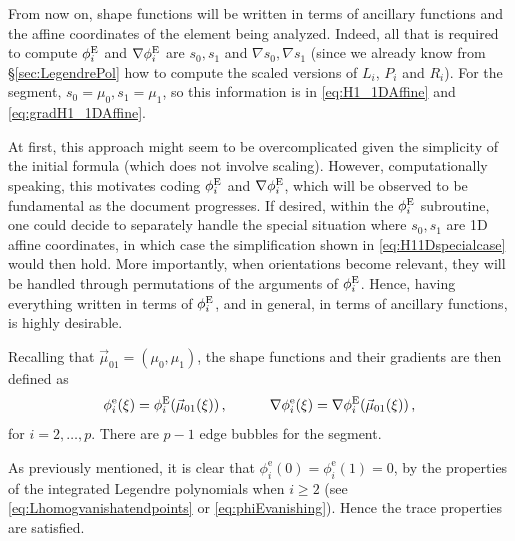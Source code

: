 From now on, shape functions will be written in terms of ancillary functions and the affine coordinates of the element being analyzed.
Indeed, all that is required to compute $\phi_i^{\mathrm{E}}$ and $\nabla\phi^{\mathrm{E}}_i$ are $s_0,s_1$ and $\nabla s_0,\nabla s_1$ (since we already know from \S\ref{sec:LegendrePol} how to compute the scaled versions of $L_i$, $P_i$ and $R_i$).
For the segment, $s_0=\mu_0,s_1=\mu_1$, so this information is in \eqref{eq:H1_1DAffine} and \eqref{eq:gradH1_1DAffine}.

At first, this approach might seem to be overcomplicated given the simplicity of the initial formula (which does not involve scaling).
However, computationally speaking, this motivates coding $\phi^{\mathrm{E}}_i$ and $\nabla\phi^{\mathrm{E}}_i$, which will be observed to be fundamental as the document progresses.
If desired, within the $\phi^{\mathrm{E}}_i$ subroutine, one could decide to separately handle the special situation where $s_0,s_1$ are 1D affine coordinates, in which case the simplification shown in \eqref{eq:H11Dspecialcase} would then hold.
More importantly, when orientations become relevant, they will be handled through permutations of the arguments of $\phi_i^{\mathrm{E}}$.
Hence, having everything written in terms of $\phi_i^{\mathrm{E}}$, and in general, in terms of ancillary functions, is highly desirable.

Recalling that $\vec{\mu}_{01}=(\mu_0,\mu_1)$, the shape functions and their gradients are then defined as
\begin{equation}
    \phi^\mathrm{e}_i(\xi) = \phi^{\mathrm{E}}_i(\vec{\mu}_{01}(\xi))\,,\qquad\quad
    	\nabla\phi^\mathrm{e}_i(\xi) = \nabla\phi^{\mathrm{E}}_i(\vec{\mu}_{01}(\xi))\,,\label{eq:phiEgeneral}
\end{equation}
for $i=2,\ldots,p$. There are $p-1$ edge bubbles for the segment.%

As previously mentioned, it is clear that $\phi^\mathrm{e}_i(0)=\phi^\mathrm{e}_i(1)=0$, by the properties of the integrated Legendre polynomials when $i\geq2$ (see \eqref{eq:Lhomogvanishatendpoints} or \eqref{eq:phiEvanishing}).
Hence the trace properties are satisfied.

